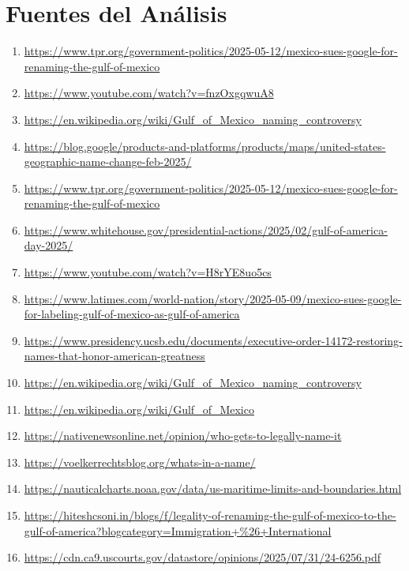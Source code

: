 \documentclass[10pt,a4paper]{article}
\begin{document}
\section*{Fuentes del Análisis}
    \begin{enumerate}[leftmargin=*]
            \item \url{ https://www.tpr.org/government-politics/2025-05-12/mexico-sues-google-for-renaming-the-gulf-of-mexico }
            \item \url{ https://www.youtube.com/watch?v=fnzOxgqwuA8 }
            \item \url{ https://en.wikipedia.org/wiki/Gulf\_of\_Mexico\_naming\_controversy }
            \item \url{ https://blog.google/products-and-platforms/products/maps/united-states-geographic-name-change-feb-2025/ }
            \item \url{ https://www.tpr.org/government-politics/2025-05-12/mexico-sues-google-for-renaming-the-gulf-of-mexico }
            \item \url{ https://www.whitehouse.gov/presidential-actions/2025/02/gulf-of-america-day-2025/ }
            \item \url{ https://www.youtube.com/watch?v=H8rYE8uo5cs }
            \item \url{ https://www.latimes.com/world-nation/story/2025-05-09/mexico-sues-google-for-labeling-gulf-of-mexico-as-gulf-of-america }
            \item \url{ https://www.presidency.ucsb.edu/documents/executive-order-14172-restoring-names-that-honor-american-greatness }
            \item \url{ https://en.wikipedia.org/wiki/Gulf\_of\_Mexico\_naming\_controversy }
            \item \url{ https://en.wikipedia.org/wiki/Gulf\_of\_Mexico }
            \item \url{ https://nativenewsonline.net/opinion/who-gets-to-legally-name-it }
            \item \url{ https://voelkerrechtsblog.org/whats-in-a-name/ }
            \item \url{ https://nauticalcharts.noaa.gov/data/us-maritime-limits-and-boundaries.html }
            \item \url{ https://hiteshcsoni.in/blogs/f/legality-of-renaming-the-gulf-of-mexico-to-the-gulf-of-america?blogcategory=Immigration+\%26+International }
            \item \url{ https://cdn.ca9.uscourts.gov/datastore/opinions/2025/07/31/24-6256.pdf }

\end{enumerate}
\end{document}
